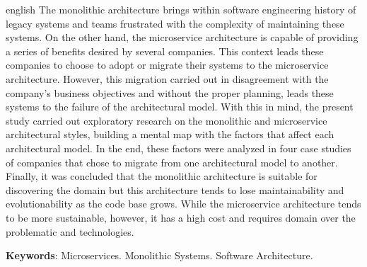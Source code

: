 \begin{resumo}[Abstract]
 \begin{otherlanguage*}{english}
    The monolithic architecture brings within software engineering history of
    legacy systems and teams frustrated with the complexity of maintaining these
    systems. On the other hand, the microservice architecture is capable of providing
    a series of benefits desired by several companies. This context leads these companies
    to choose to adopt or migrate their systems to the microservice architecture. However,
    this migration carried out in disagreement with the company's business objectives and
    without the proper planning, leads these systems to the failure of the architectural
    model. With this in mind, the present study carried out exploratory research on the
    monolithic and microservice architectural styles, building a mental map with the
    factors that affect each architectural model. In the end, these factors were analyzed
    in four case studies of companies that chose to migrate from one architectural model
    to another. Finally, it was concluded that the monolithic architecture is suitable for
    discovering the domain but this architecture tends to lose maintainability and
    evolutionability as the code base grows. While the microservice architecture tends to
    be more sustainable, however, it has a high cost and requires domain over the
    problematic and technologies.

   \vspace{\onelineskip}
 
   \noindent 
   \textbf{Keywords}: Microservices. Monolithic Systems. Software Architecture.
 \end{otherlanguage*}
\end{resumo}
